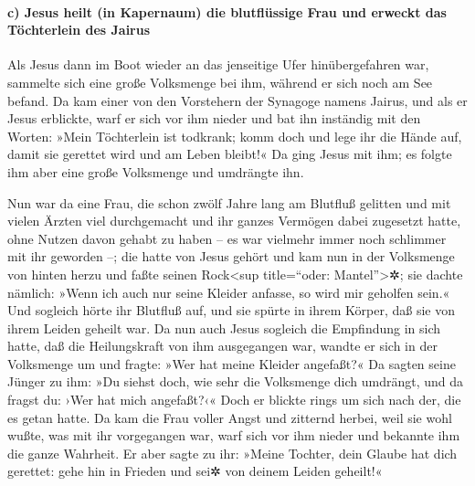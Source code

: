 \hypertarget{c-jesus-heilt-in-kapernaum-die-blutfluxfcssige-frau-und-erweckt-das-tuxf6chterlein-des-jairus}{%
\paragraph{c) Jesus heilt (in Kapernaum) die blutflüssige Frau und
erweckt das Töchterlein des
Jairus}\label{c-jesus-heilt-in-kapernaum-die-blutfluxfcssige-frau-und-erweckt-das-tuxf6chterlein-des-jairus}}

 Als Jesus dann im Boot wieder an das jenseitige Ufer
hinübergefahren war, sammelte sich eine große Volksmenge bei ihm,
während er sich noch am See befand.  Da kam einer von den
Vorstehern der Synagoge namens Jairus, und als er Jesus erblickte, warf
er sich vor ihm nieder  und bat ihn inständig mit den
Worten: »Mein Töchterlein ist todkrank; komm doch und lege ihr die Hände
auf, damit sie gerettet wird und am Leben bleibt!«  Da
ging Jesus mit ihm; es folgte ihm aber eine große Volksmenge und
umdrängte ihn.

 Nun war da eine Frau, die schon zwölf Jahre lang am
Blutfluß gelitten  und mit vielen Ärzten viel
durchgemacht und ihr ganzes Vermögen dabei zugesetzt hatte, ohne Nutzen
davon gehabt zu haben -- es war vielmehr immer noch schlimmer mit ihr
geworden --;  die hatte von Jesus gehört und kam nun in
der Volksmenge von hinten herzu und faßte seinen Rock\textless sup
title=``oder: Mantel''\textgreater✲;  sie dachte nämlich:
»Wenn ich auch nur seine Kleider anfasse, so wird mir geholfen sein.«
 Und sogleich hörte ihr Blutfluß auf, und sie spürte in
ihrem Körper, daß sie von ihrem Leiden geheilt war.  Da
nun auch Jesus sogleich die Empfindung in sich hatte, daß die
Heilungskraft von ihm ausgegangen war, wandte er sich in der Volksmenge
um und fragte: »Wer hat meine Kleider angefaßt?«  Da
sagten seine Jünger zu ihm: »Du siehst doch, wie sehr die Volksmenge
dich umdrängt, und da fragst du: ›Wer hat mich angefaßt?‹«
 Doch er blickte rings um sich nach der, die es getan
hatte.  Da kam die Frau voller Angst und zitternd herbei,
weil sie wohl wußte, was mit ihr vorgegangen war, warf sich vor ihm
nieder und bekannte ihm die ganze Wahrheit.  Er aber
sagte zu ihr: »Meine Tochter, dein Glaube hat dich gerettet: gehe hin in
Frieden und sei✲ von deinem Leiden geheilt!«

